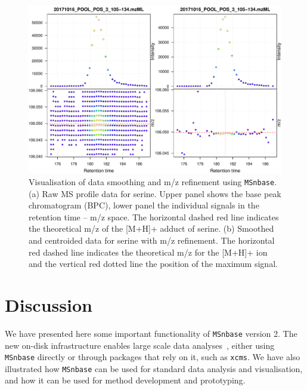 \documentclass[journal=jacsat,manuscript=article]{achemso}\usepackage[]{graphicx}\usepackage[]{color}
\begin{document}
\begin{figure}
  \centering
  \includegraphics[width=\linewidth]{./figure/centroiding.pdf}
  \caption{Visualisation of data smoothing and m/z refinement using
    \texttt{MSnbase}. (a) Raw MS profile data for serine. Upper panel
    shows the base peak chromatogram (BPC), lower panel the individual
    signals in the retention time -- m/z space. The horizontal dashed
    red line indicates the theoretical m/z of the [M+H]+ adduct of
    serine. (b) Smoothed and centroided data for serine with m/z
    refinement. The horizontal red dashed line indicates the
    theoretical m/z for the [M+H]+ ion and the vertical red dotted
    line the position of the maximum signal. }
  \label{fig:cent}
\end{figure}


\section{Discussion}

We have presented here some important functionality of
\texttt{MSnbase} version 2. The new on-disk infrastructure enables
large scale data analyses~\cite{Nothias:2020}, either using
\texttt{MSnbase} directly or through packages that rely on it, such as
\texttt{xcms}. We have also illustrated how \texttt{MSnbase} can be
used for standard data analysis and visualisation, and how it can be
used for method development and prototyping.
\end{document}
